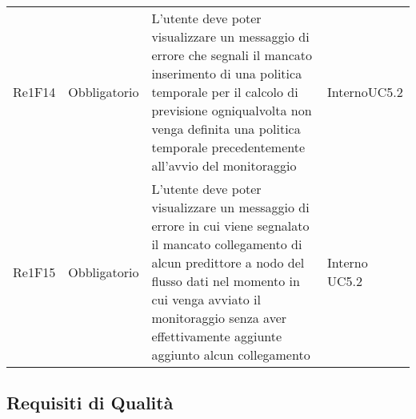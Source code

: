 \begin{longtable}{C{3cm} C{3cm} L{5.5cm} C{3cm}}
Re1F14 & Obbligatorio & L'utente deve poter visualizzare un messaggio di errore che segnali il mancato inserimento di una politica temporale per il calcolo di previsione ogniqualvolta non venga definita una politica temporale precedentemente all'avvio del monitoraggio &  Interno\newline UC5.2\\
Re1F15 & Obbligatorio & L'utente deve poter visualizzare un messaggio di errore in cui viene segnalato il mancato collegamento di alcun predittore a nodo del flusso dati nel momento in cui venga avviato il monitoraggio senza aver effettivamente aggiunte aggiunto alcun collegamento &  Interno\newline
UC5.2\\

\end{longtable}


\pagebreak
 	\subsection{Requisiti di Qualità}

